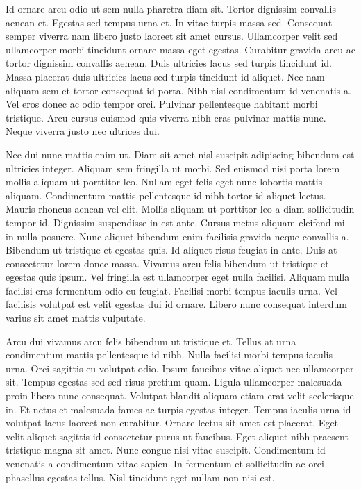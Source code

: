 \documentclass[a4]{report}
\begin{document}
Id ornare arcu odio ut sem nulla pharetra diam sit. Tortor dignissim convallis aenean et. Egestas sed tempus urna et. In vitae turpis massa sed. Consequat semper viverra nam libero justo laoreet sit amet cursus. Ullamcorper velit sed ullamcorper morbi tincidunt ornare massa eget egestas. Curabitur gravida arcu ac tortor dignissim convallis aenean. Duis ultricies lacus sed turpis tincidunt id. Massa placerat duis ultricies lacus sed turpis tincidunt id aliquet. Nec nam aliquam sem et tortor consequat id porta. Nibh nisl condimentum id venenatis a. Vel eros donec ac odio tempor orci. Pulvinar pellentesque habitant morbi tristique. Arcu cursus euismod quis viverra nibh cras pulvinar mattis nunc. Neque viverra justo nec ultrices dui.

Nec dui nunc mattis enim ut. Diam sit amet nisl suscipit adipiscing bibendum est ultricies integer. Aliquam sem fringilla ut morbi. Sed euismod nisi porta lorem mollis aliquam ut porttitor leo. Nullam eget felis eget nunc lobortis mattis aliquam. Condimentum mattis pellentesque id nibh tortor id aliquet lectus. Mauris rhoncus aenean vel elit. Mollis aliquam ut porttitor leo a diam sollicitudin tempor id. Dignissim suspendisse in est ante. Cursus metus aliquam eleifend mi in nulla posuere. Nunc aliquet bibendum enim facilisis gravida neque convallis a. Bibendum ut tristique et egestas quis. Id aliquet risus feugiat in ante. Duis at consectetur lorem donec massa. Vivamus arcu felis bibendum ut tristique et egestas quis ipsum. Vel fringilla est ullamcorper eget nulla facilisi. Aliquam nulla facilisi cras fermentum odio eu feugiat. Facilisi morbi tempus iaculis urna. Vel facilisis volutpat est velit egestas dui id ornare. Libero nunc consequat interdum varius sit amet mattis vulputate.

Arcu dui vivamus arcu felis bibendum ut tristique et. Tellus at urna condimentum mattis pellentesque id nibh. Nulla facilisi morbi tempus iaculis urna. Orci sagittis eu volutpat odio. Ipsum faucibus vitae aliquet nec ullamcorper sit. Tempus egestas sed sed risus pretium quam. Ligula ullamcorper malesuada proin libero nunc consequat. Volutpat blandit aliquam etiam erat velit scelerisque in. Et netus et malesuada fames ac turpis egestas integer. Tempus iaculis urna id volutpat lacus laoreet non curabitur. Ornare lectus sit amet est placerat. Eget velit aliquet sagittis id consectetur purus ut faucibus. Eget aliquet nibh praesent tristique magna sit amet. Nunc congue nisi vitae suscipit. Condimentum id venenatis a condimentum vitae sapien. In fermentum et sollicitudin ac orci phasellus egestas tellus. Nisl tincidunt eget nullam non nisi est.

\newpage{}
\listoffigures
\end{document}
